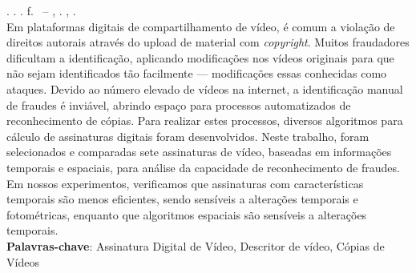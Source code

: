 
\begin{resumo}[RESUMO]
\begin{SingleSpacing}

\imprimirautorcitacao. \imprimirtitulo. \imprimirdata. \pageref {LastPage} f. \imprimirprojeto\ – \imprimirprograma, \imprimirinstituicao. \imprimirlocal, \imprimirdata.\\


Em plataformas digitais de compartilhamento de vídeo, é comum a violação de direitos autorais através do upload de material com \emph{copyright}. Muitos fraudadores dificultam a identificação, aplicando modificações nos vídeos originais para que não sejam identificados tão facilmente --- modificações essas conhecidas como ataques. Devido ao número elevado de vídeos na internet, a identificação manual de fraudes é inviável, abrindo espaço para processos automatizados de reconhecimento de cópias. Para realizar estes processos, diversos algoritmos para cálculo de assinaturas digitais foram desenvolvidos. Neste trabalho, foram selecionados e comparadas sete assinaturas de vídeo, baseadas em informações temporais e espaciais, para análise da capacidade de reconhecimento de fraudes. Em nossos experimentos, verificamos que assinaturas com características temporais são menos eficientes, sendo sensíveis a alterações temporais e fotométricas, enquanto que algoritmos espaciais são sensíveis a alterações temporais. \\

\textbf{Palavras-chave}: Assinatura Digital de Vídeo, Descritor de vídeo, Cópias de Vídeos

\end{SingleSpacing}
\end{resumo}


